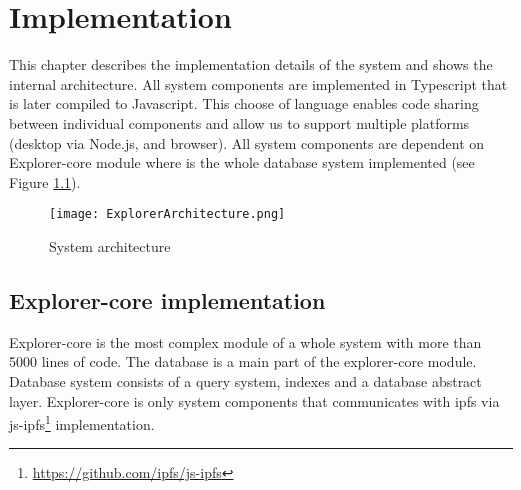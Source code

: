 \chapter{Implementation}
\label{Implementation}
This chapter describes the implementation details of the system and shows the internal
architecture. All system components are implemented in Typescript that is later compiled to Javascript. This choose of language enables code sharing between individual components and allow us to support multiple platforms (desktop via Node.js, and browser). All system components are dependent on Explorer-core module where is the whole database system implemented (see Figure \ref{systemArchitecture}). 


\begin{figure}[h]
    \centering
    \texttt{[image: ExplorerArchitecture.png]}
    \caption{System architecture}
    \label{systemArchitecture}
\end{figure}


\section{Explorer-core implementation}
Explorer-core is the most complex module of a whole system with more than 5000 lines of code. The database is a main part of the explorer-core module. Database system consists of a query system, indexes and a database abstract layer. Explorer-core is only system components that communicates with ipfs via js-ipfs\footnote{\url{https://github.com/ipfs/js-ipfs}} implementation.

